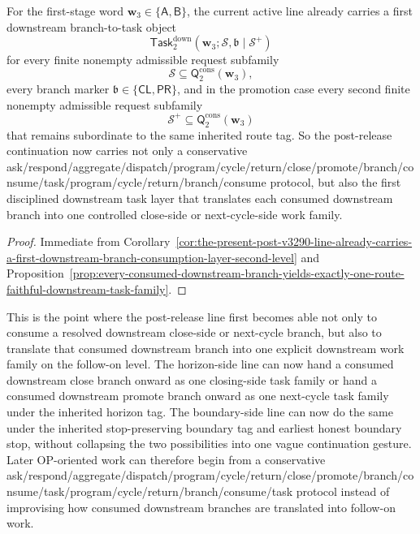 \begin{corollary}
\label{cor:the-present-post-v3290-line-already-carries-a-first-downstream-branch-to-task-layer-on-the-consumed-follow-on-level}
For the first-stage word \(\mathbf w_3\in\{\mathsf A,\mathsf B\}\), the current active line already carries a first downstream branch-to-task object
\[
  \mathsf{Task}^{\mathrm{down}}_{2}(\mathbf w_3;\mathcal S,\mathfrak b\mid\mathcal S^{+})
\]
for every finite nonempty admissible request subfamily
\[
  \mathcal S\subseteq \mathsf{Q}^{\mathrm{cons}}_{2}(\mathbf w_3),
\]
every branch marker \(\mathfrak b\in\{\mathsf{CL},\mathsf{PR}\}\), and in the promotion case every second finite nonempty admissible request subfamily
\[
  \mathcal S^{+}\subseteq \mathsf{Q}^{\mathrm{cons}}_{2}(\mathbf w_3)
\]
that remains subordinate to the same inherited route tag. So the post-release continuation now carries not only a conservative ask/respond/aggregate/dispatch/program/cycle/return/close/promote/branch/consume/task/program/cycle/return/branch/consume protocol, but also the first disciplined downstream task layer that translates each consumed downstream branch into one controlled close-side or next-cycle-side work family.
\end{corollary}

\begin{proof}
Immediate from Corollary~\ref{cor:the-present-post-v3290-line-already-carries-a-first-downstream-branch-consumption-layer-second-level} and Proposition~\ref{prop:every-consumed-downstream-branch-yields-exactly-one-route-faithful-downstream-task-family}.
\end{proof}

\begin{remark}
\label{rem:what-the-first-downstream-branch-to-task-layer-on-the-consumed-follow-on-level-now-buys}
This is the point where the post-release line first becomes able not only to consume a resolved downstream close-side or next-cycle branch, but also to translate that consumed downstream branch into one explicit downstream work family on the follow-on level. The horizon-side line can now hand a consumed downstream close branch onward as one closing-side task family or hand a consumed downstream promote branch onward as one next-cycle task family under the inherited horizon tag. The boundary-side line can now do the same under the inherited stop-preserving boundary tag and earliest honest boundary stop, without collapsing the two possibilities into one vague continuation gesture. Later OP-oriented work can therefore begin from a conservative ask/respond/aggregate/dispatch/program/cycle/return/close/promote/branch/consume/task/program/cycle/return/branch/consume/task protocol instead of improvising how consumed downstream branches are translated into follow-on work.
\end{remark}


